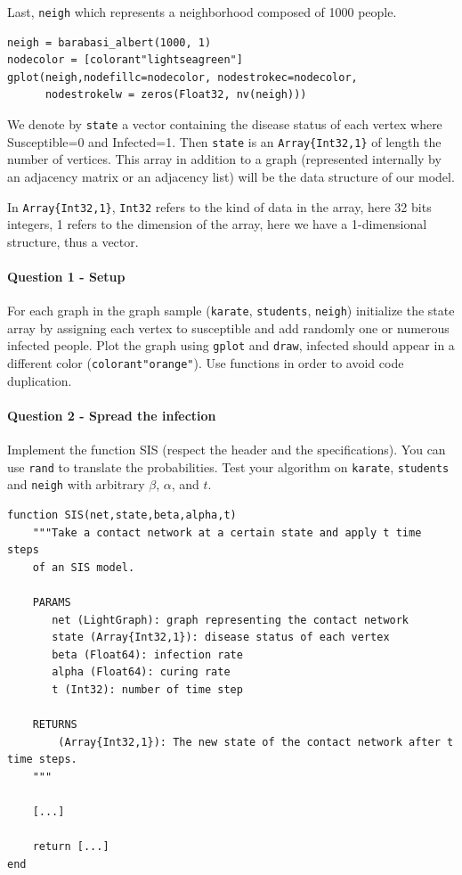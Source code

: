 \documentclass{article}
\begin{document}
Last, \texttt{neigh} which represents a neighborhood composed of 1000 people.

\begin{verbatim}
neigh = barabasi_albert(1000, 1)
nodecolor = [colorant"lightseagreen"]
gplot(neigh,nodefillc=nodecolor, nodestrokec=nodecolor,
      nodestrokelw = zeros(Float32, nv(neigh)))
\end{verbatim}

We denote by \texttt{state} a vector containing the disease status of each vertex where Susceptible=0 and Infected=1. Then \texttt{state} is an \texttt{Array\{Int32,1\}} of length the number of vertices. This array in addition to a graph (represented internally by an adjacency matrix or an adjacency list) will be the data structure of our model.

In \texttt{Array\{Int32,1\}}, \texttt{Int32} refers to the kind of data in the array, here 32 bits integers, 1 refers to the dimension of the array, here we have a 1-dimensional structure, thus a vector.

\paragraph{Question 1 - Setup} For each graph in the graph sample (\texttt{karate}, \texttt{students}, \texttt{neigh}) initialize the state array by assigning each vertex to susceptible and add randomly one or numerous infected people. Plot the graph using \texttt{gplot} and \texttt{draw}, infected should appear in a different color (\texttt{colorant"orange"}). Use functions in order to avoid code duplication. 

\paragraph{Question 2 - Spread the infection} Implement the function SIS (respect the header and the specifications). You can use \texttt{rand} to translate the probabilities. Test your algorithm on \texttt{karate}, \texttt{students} and \texttt{neigh} with arbitrary $\beta$, $\alpha$, and $t$.

\begin{verbatim}
function SIS(net,state,beta,alpha,t)
    """Take a contact network at a certain state and apply t time steps
    of an SIS model.
    
    PARAMS
       net (LightGraph): graph representing the contact network
       state (Array{Int32,1}): disease status of each vertex
       beta (Float64): infection rate
       alpha (Float64): curing rate
       t (Int32): number of time step
    
    RETURNS
        (Array{Int32,1}): The new state of the contact network after t time steps.
    """ 

    [...]    

    return [...] 
end
\end{verbatim}
\end{document}
